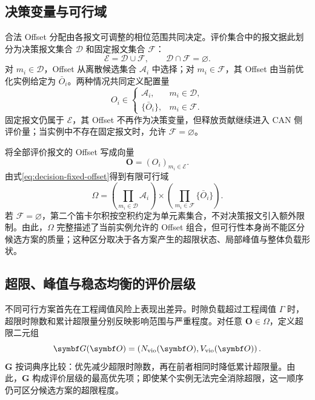 \documentclass[UTF8,a4paper,twoside,zihao=-4]{ctexart}
\numberwithin{equation}{section}
\numberwithin{figure}{section}
\numberwithin{table}{section}
\theoremstyle{definition}
\newcommand{\Oset}{\mathcal{A}}
\newcommand{\Eset}{\mathcal{E}}
\newcommand{\Fset}{\mathcal{F}}
\numberwithin{algocf}{section}
\begin{document}
\subsection{决策变量与可行域}

合法 Offset 分配由各报文可调整的相位范围共同决定。评价集合中的报文据此划分为决策报文集合 $\mathcal D$ 和固定报文集合 $\Fset$：
\begin{equation}
 \Eset=\mathcal D\cup\Fset,
 \qquad
 \mathcal D\cap\Fset=\varnothing.
\label{eq:decision-fixed-partition}
\end{equation}
对 $m_i\in\mathcal D$，Offset 从离散候选集合 $\Oset_i$ 中选择；对 $m_i\in\Fset$，其 Offset 由当前优化实例给定为 $\bar O_i$。两种情况共同定义配置量
\begin{equation}
 O_i\in
 \begin{cases}
  \Oset_i, & m_i\in\mathcal D,\\
  \{\bar O_i\}, & m_i\in\Fset.
 \end{cases}
\label{eq:decision-fixed-offset}
\end{equation}
固定报文仍属于 $\Eset$，其 Offset 不再作为决策变量，但释放贡献继续进入 CAN 侧评价量；当实例中不存在固定报文时，允许 $\Fset=\varnothing$。

将全部评价报文的 Offset 写成向量
\begin{equation}
 \symbf O=(O_i)_{m_i\in\Eset}.
\label{eq:offset-decision-vector}
\end{equation}
由式\eqref{eq:decision-fixed-offset}得到有限可行域
\begin{equation}
 \Omega=
 \left(\prod_{m_i\in\mathcal D}\Oset_i\right)
 \times
 \left(\prod_{m_i\in\Fset}\{\bar O_i\}\right).
\label{eq:offset-feasible-domain}
\end{equation}
若 $\Fset=\varnothing$，第二个笛卡尔积按空积约定为单元素集合，不对决策报文引入额外限制。由此，$\Omega$ 完整描述了当前实例允许的 Offset 组合，但可行性本身尚不能区分候选方案的质量；这种区分取决于各方案产生的超限状态、局部峰值与整体负载形状。

\subsection{超限、峰值与稳态均衡的评价层级}

不同可行方案首先在工程阈值风险上表现出差异。时隙负载超过工程阈值 $\Gamma$ 时，超限时隙数和累计超限量分别反映影响范围与严重程度。对任意 $\symbf O\in\Omega$，定义超限二元组
\begin{equation}
 \symbf G(\symbf O)=
 \left(
  N_{\rm vio}(\symbf O),
  V_{\rm vio}(\symbf O)
 \right).
\label{eq:violation-key}
\end{equation}
$\symbf G$ 按词典序比较：优先减少超限时隙数，再在前者相同时降低累计超限量。由此，$\symbf G$ 构成评价层级的最高优先项；即使某个实例无法完全消除超限，这一顺序仍可区分候选方案的超限程度。
\end{document}
